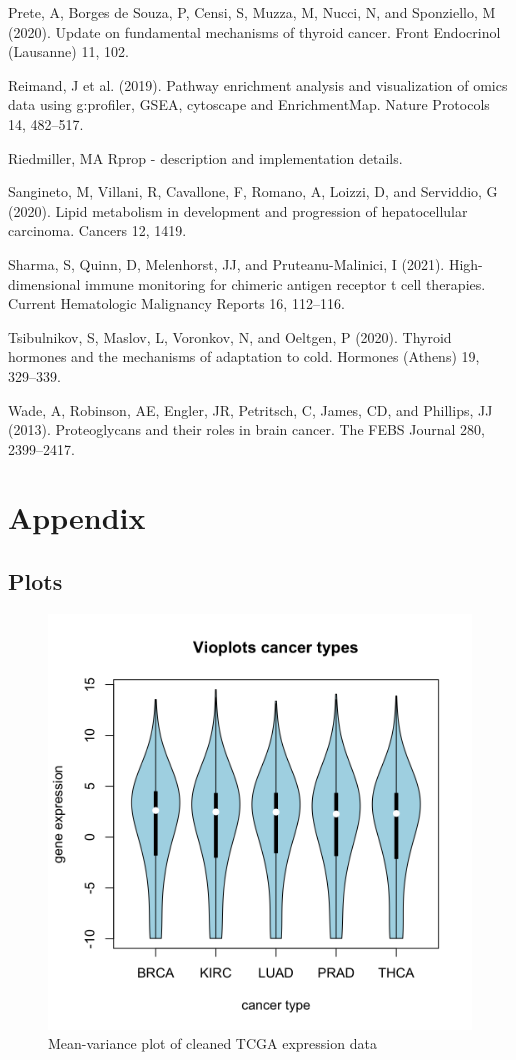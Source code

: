 \documentclass[
  parskip,
  oneside]{scrreprt}
\newlength{\cslhangindent}
\newlength{\cslentryspacingunit} %
\newenvironment{CSLReferences}[2] %
 {%
  \setlength{\parindent}{0pt}
  \ifodd #1
  \let\oldpar\par
  \def\par{\hangindent=\cslhangindent\oldpar}
  \fi
  \setlength{\parskip}{#2\cslentryspacingunit}
 }%
 {}
\begin{document}
\begin{CSLReferences}{0}{0}
\leavevmode{}%
Prete, A, Borges de Souza, P, Censi, S, Muzza, M, Nucci, N, and
Sponziello, M (2020). Update on fundamental mechanisms of thyroid
cancer. Front Endocrinol (Lausanne) 11, 102.

\leavevmode{}%
Reimand, J et al. (2019). Pathway enrichment analysis and visualization
of omics data using g:profiler, GSEA, cytoscape and EnrichmentMap.
Nature Protocols 14, 482--517.

\leavevmode{}%
Riedmiller, MA Rprop - description and implementation details.

\leavevmode{}%
Sangineto, M, Villani, R, Cavallone, F, Romano, A, Loizzi, D, and
Serviddio, G (2020). Lipid metabolism in development and progression of
hepatocellular carcinoma. Cancers 12, 1419.

\leavevmode{}%
Sharma, S, Quinn, D, Melenhorst, JJ, and Pruteanu-Malinici, I (2021).
High-dimensional immune monitoring for chimeric antigen receptor t cell
therapies. Current Hematologic Malignancy Reports 16, 112--116.

\leavevmode{}%
Tsibulnikov, S, Maslov, L, Voronkov, N, and Oeltgen, P (2020). Thyroid
hormones and the mechanisms of adaptation to cold. Hormones (Athens) 19,
329--339.

\leavevmode{}%
Wade, A, Robinson, AE, Engler, JR, Petritsch, C, James, CD, and
Phillips, JJ (2013). Proteoglycans and their roles in brain cancer. The
FEBS Journal 280, 2399--2417.

\end{CSLReferences}

\hypertarget{appendix}{%
\chapter{Appendix}\label{appendix}}

\hypertarget{plots}{%
\section{Plots}\label{plots}}

\begin{figure}

{\centering \includegraphics[width=0.3\linewidth]{figures/Vioplots cancer types} 

}

\caption{Mean-variance plot of cleaned TCGA expression data}\label{fig:showviolinplots}
\end{figure}
\end{document}
